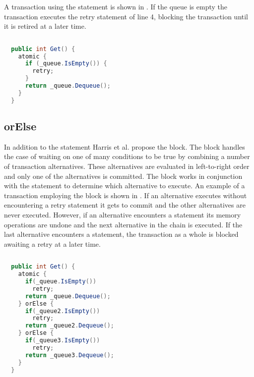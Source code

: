 A transaction using the  statement is shown in . If the queue is empty the transaction executes the retry statement of line 4, blocking the transaction until it is retired at a later time.
\begin{lstlisting}[label=lst:stm_retry,
 caption={Queue with retry},
 language=Java, 
 showspaces=false,
 showtabs=false,
 breaklines=true,
 showstringspaces=false,
 breakatwhitespace=true,
 commentstyle=\color{greencomments},
 keywordstyle=\color{bluekeywords},
 stringstyle=\color{redstrings},
 morekeywords={atomic, retry, orElse}]  % Start your code-block
  
  public int Get() {
    atomic {
      if (_queue.IsEmpty()) {
        retry;
      }
      return _queue.Dequeue();
    }
  }
\end{lstlisting}

\subsection{orElse}
In addition to the  statement Harris et al. propose the  block. The  block handles the case of waiting on one of many conditions to be true by combining a number of transaction alternatives. These alternatives are evaluated in left-to-right order and only one of the alternatives is committed\cite[p. 52]{harris2005composable}. The  block works in conjunction with the  statement to determine which alternative to execute. An example of a transaction employing the  block is shown in . If an alternative executes without encountering a retry statement it gets to commit and the other alternatives are never executed\cite[p. 74]{harris2010transactional}. However, if an alternative encounters a  statement its memory operations are undone and the next alternative in the chain is executed\cite[p. 74]{harris2010transactional}. If the last alternative encounters a  statement, the transaction as a whole is blocked awaiting a retry at a later time\cite[p. 74]{harris2010transactional}.

\begin{lstlisting}[label=lst:stm_orelse,
 caption={Queue with orElse},
 language=Java, 
 showspaces=false,
 showtabs=false,
 breaklines=true,
 showstringspaces=false,
 breakatwhitespace=true,
 commentstyle=\color{greencomments},
 keywordstyle=\color{bluekeywords},
 stringstyle=\color{redstrings},
 morekeywords={atomic, retry, orElse}]  % Start your code-block
  
  public int Get() {
    atomic {
      if(_queue.IsEmpty())
        retry;
      return _queue.Dequeue();
    } orElse {
      if(_queue2.IsEmpty())
        retry;
      return _queue2.Dequeue();
    } orElse {
      if(_queue3.IsEmpty())
        retry;
      return _queue3.Dequeue();
    }
  }
\end{lstlisting}

%
\worksheetend

